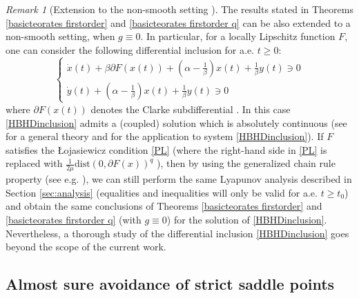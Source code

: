 \documentclass[reqno]{amsart}
\theoremstyle{plain}
\theoremstyle{definition}
\theoremstyle{remark}
\newtheorem{remark}{Remark}	%
\newcommand{\PM}[1]{}
\begin{document}
\begin{remark}[Extension to the non-smooth setting \cite{castera2021inertial}] The results stated in Theorems \ref{basicteorates firstorder} and \ref{basicteorates firstorder q} can be also extended to a non-smooth setting, when $g\equiv0$. In particular, for a locally Lipschitz function $F$, one can consider the following differential inclusion for a.e. $t\geq0$:
		\begin{equation}
			\begin{cases}{}\label{HBHDinclusion}
				\dot{x}(t) +\beta\partial F(x(t)) + \left(\alpha-\frac{1}{\beta}\right)x(t) + \frac{1}{\beta}y(t) \ni 0 \\
				\dot{y}(t) + \left(\alpha-\frac{1}{\beta}\right)x(t) + \frac{1}{\beta}y(t) \ni 0 
			\end{cases}
		\end{equation}
		where $\partial F(x(t))$ denotes the Clarke subdifferential \cite[Definition $10.3$]{clarke2013functional}. In this case \eqref{HBHDinclusion} admits a (coupled) solution which is absolutely continuous (see \cite{aubin1999set} for a general theory and \cite{castera2021inertial} for the application to system \ref{HBHDinclusion}). If $F$ satisfies the \L ojasiewicz condition \ref{PL} (where the right-hand side in \ref{PL} is replaced with $\frac{1}{2\mu}\text{dist}\left(0 , \partial F(x)\right)^{q}$ ), then by using the generalized chain rule property (see e.g. \cite[Lemma $4$]{castera2021inertial}), we can still perform the same Lyapunov analysis described in Section \ref{sec:analysis} (equalities and inequalities will only be valid for a.e. $t\geq t_{0}$) and obtain the same conclusions of Theorems \ref{basicteorates firstorder} and \ref{basicteorates firstorder q} (with $g\equiv 0$) for the solution of \eqref{HBHDinclusion}. Nevertheless, a thorough study of the differential inclusion \eqref{HBHDinclusion} goes beyond the scope of the current work.
	\end{remark}

\PM{Put this as a future direction in the conclusions section.}

\subsection{Almost sure avoidance of strict saddle points} 
\PM{To be done: move to separate subsection at end; introduce required notions to state the theorem; avoid informal statements ("we can guarantee the convergence"... what does this mean, precisely?); simplify statements (since $\obj$ satisfies KL).} 
\end{document}
